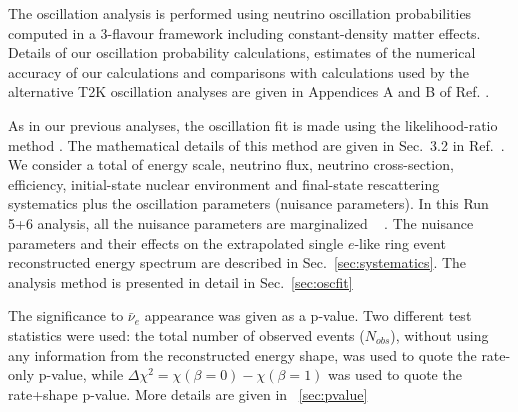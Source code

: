 The oscillation analysis is performed using neutrino oscillation probabilities computed in a 3-flavour
framework including constant-density matter effects. 
Details of our oscillation probability calculations, estimates of the numerical accuracy of our
calculations and comparisons with calculations used by the alternative T2K oscillation analyses 
are given in Appendices A and B of Ref. \cite{OurRun123DisappAnalysis3Flavour}.

As in our previous analyses, the oscillation fit is made using the likelihood-ratio method \cite{StatAnalysisCowan}.
The mathematical details of this method are given in Sec.\ 3.2 in Ref.\ \cite{OurRun1DisappAnalysis}.
We consider a total of \NSyst{} energy scale, neutrino flux, neutrino cross-section,
efficiency, initial-state nuclear environment and final-state rescattering systematics 
plus the oscillation parameters (nuisance parameters).
In this Run 5+6 analysis, all the nuisance parameters are marginalized 
~ \cite{CousinsHighland}
.
The nuisance parameters and their effects 
on the extrapolated single $e$-like ring event reconstructed energy spectrum are described in Sec.~\ref{sec:systematics}.
The analysis method is presented in detail in Sec.~\ref{sec:oscfit}


The significance to $\bar{\nu}_e$ appearance was given as a p-value.
Two different test statistics were used: 
the total number of observed events ($N_{obs}$), without using any information from the 
reconstructed energy shape, was used to quote the rate-only p-value,
while $\Delta \chi^2 = \chi(\beta=0) - \chi(\beta=1)$ was used to quote the rate+shape p-value.
More details are given in ~\ref{sec:pvalue}

